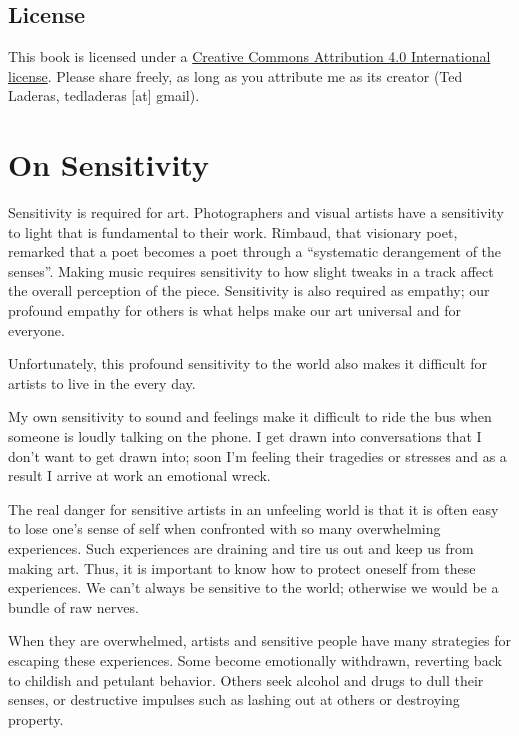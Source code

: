 \documentclass[
]{book}
\begin{document}
\hypertarget{license}{%
\section{License}\label{license}}

This book is licensed under a \href{http://creativecommons.org/licenses/by/4.0/}{Creative Commons Attribution 4.0 International license}. Please share freely, as long as you attribute me as its creator (Ted Laderas, tedladeras {[}at{]} gmail).

\hypertarget{on-sensitivity}{%
\chapter{On Sensitivity}\label{on-sensitivity}}

Sensitivity is required for art. Photographers and visual artists have a sensitivity to
light that is fundamental to their work. Rimbaud, that visionary poet, remarked
that a poet becomes a poet through a ``systematic derangement of the senses''.
Making music requires sensitivity to how slight tweaks in a track affect the overall perception of the piece. Sensitivity is also required as
empathy; our profound empathy for others is what helps make our art universal
and for everyone.

Unfortunately, this profound sensitivity to the world also makes it difficult for artists to
live in the every day.

My own sensitivity to sound and feelings make it difficult to ride the bus when
someone is loudly talking on the phone. I get drawn into conversations that I
don't want to get drawn into; soon I'm feeling their tragedies or stresses and
as a result I arrive at work an emotional wreck.

The real danger for sensitive artists in an unfeeling world is that it is often easy to
lose one's sense of self when confronted with so many overwhelming experiences.
Such experiences are draining and tire us out and keep us from making art. Thus, it is important to know
how to protect oneself from these experiences. We can't always be sensitive to
the world; otherwise we would be a bundle of raw nerves.

When they
are overwhelmed, artists and sensitive people have many strategies for escaping
these experiences. Some become emotionally withdrawn, reverting back to
childish and petulant behavior. Others seek alcohol and drugs to dull their
senses, or destructive impulses such as lashing out at others or destroying
property.
\end{document}
